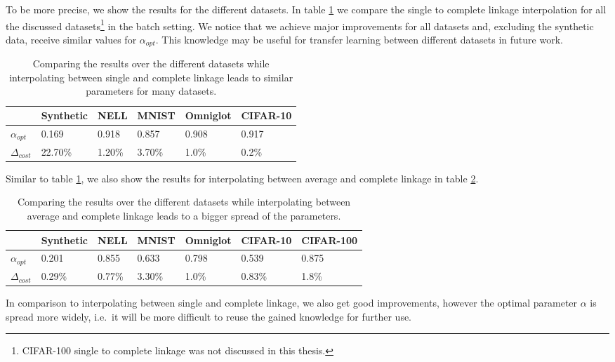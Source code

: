 To be more precise, we show the results for the different datasets. In table \ref{table:comparison} we compare the single to complete linkage interpolation for all the discussed datasets\footnote{CIFAR-100 single to complete linkage was not discussed in this thesis.} in the batch setting. We notice that we achieve major improvements for all datasets and, excluding the synthetic data, receive similar values for $\alpha_{opt}$. This knowledge may be useful for transfer learning between different datasets in future work.

\begin{table}[H]
    \centering
    \begin{tabular}{|l | l | l | l | l | l |}
    \hline
    & Synthetic & NELL & MNIST & Omniglot & CIFAR-10\\ \hline
    $\alpha_{opt}$ & 0.169 & 0.918 & 0.857 & 0.908 & 0.917\\
    $\Delta_{cost}$ & 22.70\% & 1.20\% & 3.70\% & 1.0\% & 0.2\%\\\hline
    \end{tabular}
    \caption{Comparing the results over the different datasets while interpolating between single and complete linkage leads to similar parameters for many datasets.}
    \label{table:comparison}
\end{table}

Similar to table \ref{table:comparison}, we also show the results for interpolating between average and complete linkage in table \ref{table:comparison_ac}.

\begin{table}[H]
    \centering
    \begin{tabular}{|l | l | l | l | l | l | l |}
    \hline
    & Synthetic & NELL & MNIST & Omniglot & CIFAR-10 & CIFAR-100\\ \hline
    $\alpha_{opt}$ & 0.201 & 0.855 & 0.633 & 0.798 & 0.539 & 0.875\\
    $\Delta_{cost}$ & 0.29\% & 0.77\% & 3.30\% & 1.0\% & 0.83\% & 1.8\%\\\hline
    \end{tabular}
    \caption{Comparing the results over the different datasets while interpolating between average and complete linkage leads to a bigger spread of the parameters.}
    \label{table:comparison_ac}
\end{table}

In comparison to interpolating between single and complete linkage, we also get good improvements, however the optimal parameter $\alpha$ is spread more widely, i.e.\ it will be more difficult to reuse the gained knowledge for further use.\\

